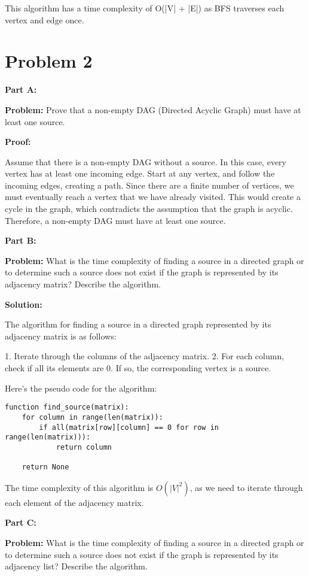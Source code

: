 \documentclass[11pt]{article}
\begin{document}
    This algorithm has a time complexity of O(|V| + |E|) as BFS traverses each vertex and edge once.


    \section{Problem 2}

    \textbf{Part A:}

    \textbf{Problem:} Prove that a non-empty DAG (Directed Acyclic Graph) must have at least one source.

    \textbf{Proof:}

    Assume that there is a non-empty DAG without a source. In this case, every vertex has at least one incoming edge. Start at any vertex, and follow the incoming edges, creating a path. Since there are a finite number of vertices, we must eventually reach a vertex that we have already visited. This would create a cycle in the graph, which contradicts the assumption that the graph is acyclic. Therefore, a non-empty DAG must have at least one source.

    \textbf{Part B:}

    \textbf{Problem:} What is the time complexity of finding a source in a directed graph or to determine such a source does not exist if the graph is represented by its adjacency matrix? Describe the algorithm.

    \textbf{Solution:}

    The algorithm for finding a source in a directed graph represented by its adjacency matrix is as follows:

    1. Iterate through the columns of the adjacency matrix.
    2. For each column, check if all its elements are 0. If so, the corresponding vertex is a source.

    Here's the pseudo code for the algorithm:

    \begin{verbatim}
function find_source(matrix):
    for column in range(len(matrix)):
        if all(matrix[row][column] == 0 for row in range(len(matrix))):
            return column

    return None
    \end{verbatim}

    The time complexity of this algorithm is $O(|V|^2)$, as we need to iterate through each element of the adjacency matrix.

    \textbf{Part C:}

    \textbf{Problem:} What is the time complexity of finding a source in a directed graph or to determine such a source does not exist if the graph is represented by its adjacency list? Describe the algorithm.
\end{document}
